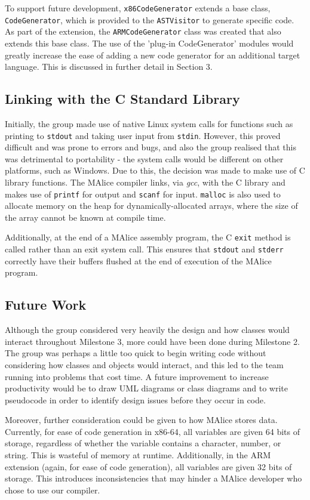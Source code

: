 \documentclass[a4wide, 11pt]{article}
\begin{document}
To support future development, \texttt{x86CodeGenerator} extends a base class,
\texttt{CodeGenerator}, which is provided to the \texttt{ASTVisitor} to
generate specific code.
As part of the extension, the \texttt{ARMCodeGenerator} class was
created that also extends this base class. The use of the 'plug-in CodeGenerator' modules
would greatly increase the ease of adding a new code generator for an additional
target language. This is discussed in further detail in Section 3.

\subsection{Linking with the C Standard Library}
Initially, the group made use of native Linux system calls for functions such
as printing to \texttt{stdout} and taking user input from \texttt{stdin}. 
However, this proved difficult and was prone to errors and bugs, and also
the group realised that this was detrimental to portability - the system calls
would be different on other platforms, such as Windows. Due to this, the 
decision was made to make use of C library functions. The MAlice compiler links,
via \emph{gcc}, with the C library and makes use of \texttt{printf} for output
and \texttt{scanf} for input. \texttt{malloc} is also used to allocate memory
on the heap for dynamically-allocated arrays, where the size of the array
cannot be known at compile time. 

Additionally, at the end of a MAlice assembly program, the C \texttt{exit} 
method is called rather than an exit system call. This ensures that 
\texttt{stdout} and \texttt{stderr} correctly have their buffers flushed at the
end of execution of the MAlice program.

\subsection{Future Work}

Although the group considered very heavily the design and how classes would
interact throughout Milestone 3, more could have been done during Milestone 2.
The group was perhaps a little too quick to begin writing code without 
considering how classes and objects would interact, and this led to the team 
running into problems that cost time. A future improvement to increase 
productivity would be to draw UML diagrams or class diagrams and to write
pseudocode in order to identify design issues before they occur in code.

Moreover, further consideration could be given to how MAlice stores data. 
Currently, for ease of code generation in x86-64, all variables are given
64 bits of storage, regardless of whether the variable contains a character,
number, or string. This is wasteful of memory at runtime. Additionally, in the
ARM extension (again, for ease of code generation), all variables are given
32 bits of storage. This introduces inconsistencies that may hinder a MAlice
developer who chose to use our compiler.
\end{document}
